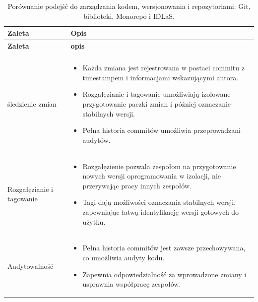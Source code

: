 \documentclass[runningheads,12pt]{llncs}
\begin{document}
\begin{longtable}{|C{3cm}|C{9.1cm}|}
    \caption{Porównanie podejść do zarządzania kodem, wersjonowania i repozytoriami: Git, biblioteki, Monorepo i IDLaS.} \\
    \hline
    \textbf{Zaleta} & \textbf{Opis} \\
    \hline
    \endfirsthead

    \hline
    \textbf{Zaleta} & \textbf{opis} \\
    \hline
    \endhead

    \hline
    \endfoot

    \hline
    \endlastfoot

     \\ \hline
    śledzienie zmian &
    \begin{itemize}
      \item Każda zmiana jest rejestrowana w postaci commitu z timestampem i informacjami wskazującymi autora.
      \item Rozgałęzianie i tagowanie umożliwiają izolowane przygotowanie paczki zmian i później oznaczanie stabilnych wersji.
      \item Pełna historia commitów umożliwia przeprowadzani audytów.
    \end{itemize} \\ \hline
    Rozgałęzianie i tagowanie &
    \begin{itemize}
      \item Rozgałęzienie pozwala zespołom na przygotowanie nowych wersji oprogramowania w izolacji, nie przerywając pracy innych zespołów.
      \item Tagi dają możliwości oznaczania stabilnych wersji, zapewniając łatwą identyfikację wersji gotowych do użytku.
    \end{itemize} \\ \hline
    Audytowalność &
    \begin{itemize}
      \item Pełna historia commitów jest zawsze przechowywana, co umożliwia audyty kodu.
      \item Zapewnia odpowiedzialność za wprowadzone zmiany i usprawnia współpracę zespołów.
    \end{itemize} \\ \hline


\end{longtable}
\end{document}

